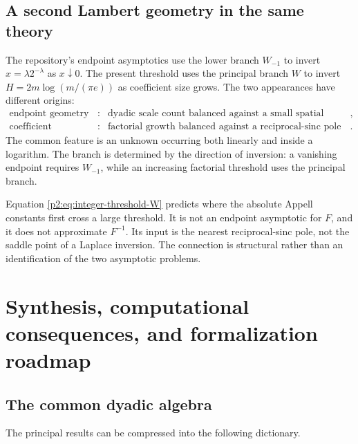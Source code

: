 \documentclass[11pt,oneside]{article}
\numberwithin{equation}{section}
\theoremstyle{definition}
\theoremstyle{remark}
\begin{document}
\subsection{A second Lambert geometry in the same theory}

The repository's endpoint asymptotics use the lower branch $W_{-1}$ to invert
$x=\lambda2^{-\lambda}$ as $x\downarrow0$.  The present threshold uses the principal branch $W$
to invert $H=2m\log(m/(\pi e))$ as coefficient size grows.  The two appearances have different
origins:
\begin{equation}
 \begin{array}{ccl}
 \text{endpoint geometry} &:&
 \text{dyadic scale count balanced against a small spatial argument},\\[0.25em]
 \text{coefficient geometry} &:&
 \text{factorial growth balanced against a reciprocal-sinc pole radius}.
 \end{array}
 \label{p2:eq:two-Lambert-roles}
\end{equation}
The common feature is an unknown occurring both linearly and inside a logarithm.  The branch is
determined by the direction of inversion: a vanishing endpoint requires $W_{-1}$, while an increasing
factorial threshold uses the principal branch.

\begin{cautionbox}
Equation \eqref{p2:eq:integer-threshold-W} predicts where the absolute Appell constants first cross a
large threshold.  It is not an endpoint asymptotic for $F$, and it does not approximate $F^{-1}$.
Its input is the nearest reciprocal-sinc pole, not the saddle point of a Laplace inversion.  The
connection is structural rather than an identification of the two asymptotic problems.
\end{cautionbox}

\section{Synthesis, computational consequences, and formalization roadmap}
\label{p2:sec:synthesis}

\subsection{The common dyadic algebra}

The principal results can be compressed into the following dictionary.
\end{document}
